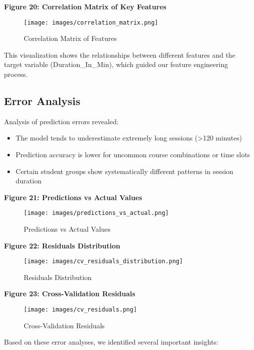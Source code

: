 \documentclass[12pt,letterpaper]{article}
\begin{document}
\textbf{Figure 20: Correlation Matrix of Key Features}

\begin{figure}[H]
    \centering
    \texttt{[image: images/correlation\_matrix.png]}
    \caption{Correlation Matrix of Features}
\end{figure}

This visualization shows the relationships between different features and the target variable (Duration\_In\_Min), which guided our feature engineering process.

\subsection{Error Analysis}

Analysis of prediction errors revealed:

\begin{itemize}
    \item The model tends to underestimate extremely long sessions (>120 minutes)
    \item Prediction accuracy is lower for uncommon course combinations or time slots
    \item Certain student groups show systematically different patterns in session duration
\end{itemize}

\textbf{Figure 21: Predictions vs Actual Values}

\begin{figure}[H]
    \centering
    \texttt{[image: images/predictions\_vs\_actual.png]}
    \caption{Predictions vs Actual Values}
\end{figure}

\textbf{Figure 22: Residuals Distribution}

\begin{figure}[H]
    \centering
    \texttt{[image: images/cv\_residuals\_distribution.png]}
    \caption{Residuals Distribution}
\end{figure}

\textbf{Figure 23: Cross-Validation Residuals}

\begin{figure}[H]
    \centering
    \texttt{[image: images/cv\_residuals.png]}
    \caption{Cross-Validation Residuals}
\end{figure}

Based on these error analyses, we identified several important insights:
\end{document}
